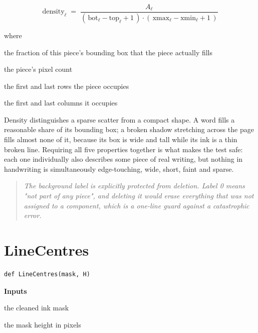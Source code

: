 \begin{equation}
\mathrm{density}_{\ell} \;=\; \frac{A_{\ell}}{(\,\mathrm{bot}_{\ell}-\mathrm{top}_{\ell}+1\,)\cdot(\,\mathrm{xmax}_{\ell}-\mathrm{xmin}_{\ell}+1\,)}
\end{equation}

\noindent where
\begin{description}[leftmargin=2.4em,style=nextline,font=\normalfont\ttfamily]\setlength\itemsep{1pt}
  \item[{$\mathrm{density}_{\ell}$}] \normalfont the fraction of this piece's bounding box that the piece actually fills
  \item[{$A_{\ell}$}] \normalfont the piece's pixel count
  \item[{$\mathrm{top}_{\ell},\,\mathrm{bot}_{\ell}$}] \normalfont the first and last rows the piece occupies
  \item[{$\mathrm{xmin}_{\ell},\,\mathrm{xmax}_{\ell}$}] \normalfont the first and last columns it occupies
\end{description}
Density distinguishes a sparse scatter from a compact shape. A word fills a reasonable share of its bounding box; a broken shadow stretching across the page fills almost none of it, because its box is wide and tall while its ink is a thin broken line. Requiring all five properties together is what makes the test safe: each one individually also describes some piece of real writing, but nothing in handwriting is simultaneously edge-touching, wide, short, faint and sparse.


\begin{quote}\small\itshape The background label is explicitly protected from deletion. Label 0 means "not part of any piece", and deleting it would erase everything that was not assigned to a component, which is a one-line guard against a catastrophic error.\end{quote}

\section{LineCentres}
\begin{lstlisting}[style=sig]
def LineCentres(mask, H)
\end{lstlisting}

\noindent\textbf{Inputs}
\begin{description}[leftmargin=2.2em,style=nextline,font=\normalfont\ttfamily]\setlength\itemsep{1pt}
  \item[{mask}] \normalfont the cleaned ink mask
  \item[{H}] \normalfont the mask height in pixels
\end{description}

